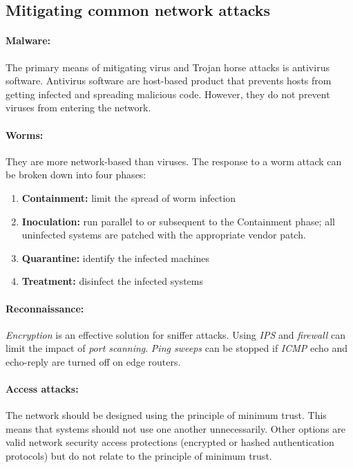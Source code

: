 \subsection{Mitigating common network attacks}

\paragraph{Malware:} The primary means of mitigating virus and Trojan horse attacks is antivirus software. Antivirus software are host-based product that prevents hosts from getting infected and spreading malicious code. However, they do not prevent viruses from entering the network.

\paragraph{Worms:} They are more network-based than viruses. The response to a worm attack can be broken down into four phases:

\begin{enumerate}
\item \textbf{\textbf{Containment}:} limit the spread of worm infection
\item \textbf{Inoculation:} run parallel to or subsequent to the Containment phase; all uninfected systems are patched with the appropriate vendor patch.
\item \textbf{Quarantine:} identify the infected machines
\item \textbf{Treatment:} disinfect the infected systems
\end{enumerate}

\paragraph{Reconnaissance:} \emph{Encryption} is an effective solution for sniffer attacks. Using \emph{IPS} and \emph{firewall} can limit the impact of \emph{port scanning}. \emph{Ping sweeps} can be stopped if \emph{ICMP} echo and echo-reply are turned off on edge routers. 

\paragraph{Access attacks:} The network should be designed using the principle of minimum trust. This means that systems should not use one another unnecessarily. Other options are valid network security access protections (encrypted or hashed authentication protocols) but do not relate to the principle of minimum trust.

